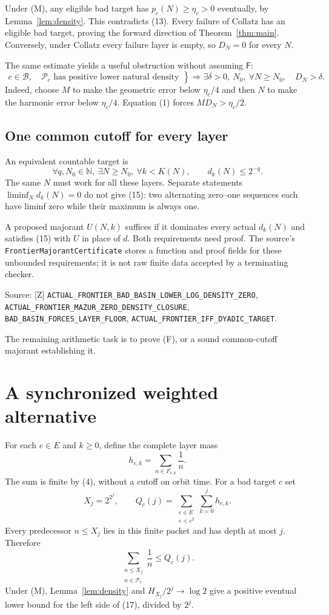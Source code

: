 \documentclass[11pt,a4paper]{article}
\theoremstyle{definition}
\newcommand{\NN}{\mathbb N}
\newcommand{\FF}{\mathsf F}
\newcommand{\Bad}{\mathcal B}
\newcommand{\Pred}{\mathcal P}
\newcommand{\source}[1]{\par{\footnotesize\color{ink}Source: #1.}\par}
\begin{document}
Under (M), any eligible bad target has $p_c(N)\ge\eta_c>0$ eventually,
by Lemma~\ref{lem:density}. This contradicts (13). Every failure of Collatz
has an eligible bad target, proving the forward direction of
Theorem~\ref{thm:main}. Conversely, under Collatz every failure layer is
empty, so $D_N=0$ for every $N$.

The same estimate yields a useful obstruction without assuming $\FF$:
\[
 \left.
 \begin{gathered}
 c\in\Bad,\quad
 \Pred_c\text{ has positive lower natural density}
 \end{gathered}\right\}
 \Longrightarrow
 \exists\delta>0,\ N_0,\ \forall N\ge N_0,\quad D_N>\delta.
 \tag{14}
\]
Indeed, choose $M$ to make the geometric error below $\eta_c/4$ and
then $N$ to make the harmonic error below $\eta_c/4$.
Equation (1) forces $M D_N>\eta_c/2$.

\subsection*{One common cutoff for every layer}
An equivalent countable target is
\[
 \forall q,N_0\in\NN,\ \exists N\ge N_0,\ 
 \forall k<K(N),\qquad d_k(N)\le2^{-q}.
 \tag{15}
\]
The same $N$ must work for all these layers. Separate statements
$\liminf_N d_k(N)=0$ do not give (15): two alternating zero--one
sequences each have liminf zero while their maximum is always one.

A proposed majorant $U(N,k)$ suffices if it dominates every actual
$d_k(N)$ and satisfies (15) with $U$ in place of $d$.
Both requirements need proof. The source's
\nolinkurl{FrontierMajorantCertificate} stores a function and proof fields
for these unbounded requirements; it is not raw finite data accepted by a
terminating checker.

\source{[Z] \nolinkurl{ACTUAL_FRONTIER_BAD_BASIN_LOWER_LOG_DENSITY_ZERO},
\nolinkurl{ACTUAL_FRONTIER_MAZUR_ZERO_DENSITY_CLOSURE},
\nolinkurl{BAD_BASIN_FORCES_LAYER_FLOOR},
\nolinkurl{ACTUAL_FRONTIER_IFF_DYADIC_TARGET}}
The remaining arithmetic task is to prove (F), or a sound common-cutoff
majorant establishing it.

\newpage
\section{A synchronized weighted alternative}
For each $e\in E$ and $k\ge0$, define the complete layer mass
\[
 h_{e,k}=\sum_{n\in F_{e,k}}\frac1n.
\]
The sum is finite by (4), without a cutoff on orbit time.
For a bad target $c$ set
\[
 X_j=2^{2^j},\qquad
 Q_c(j)=\sum_{\substack{e\in E\\ e<c^2}}\sum_{k=0}^{j}h_{e,k}.
 \tag{16}
\]
Every predecessor $n\le X_j$ lies in this finite packet and has depth
at most $j$. Therefore
\[
 \sum_{\substack{n\le X_j\\n\in\Pred_c}}\frac1n\le Q_c(j).
 \tag{17}
\]
Under (M), Lemma~\ref{lem:density} and $H_{X_j}/2^j\to\log2$ give a
positive eventual lower bound for the left side of (17), divided by $2^j$.
\end{document}

